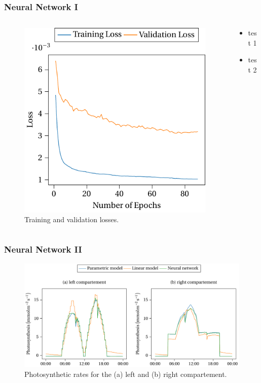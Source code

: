 \begin{frame}
    \frametitle{Neural Network I}

    \begin{columns}
        \begin{column}{0.6\textwidth}
            \begin{figure}
                \centering
                \includegraphics[scale=0.5]{figures/nn2.pdf}
                \caption{Training and validation losses.}
            \end{figure}
        \end{column}
        \begin{column}{0.4\textwidth}
            \begin{itemize}
                \item test 1
                \item test 2
            \end{itemize}
        \end{column}
    \end{columns}
\end{frame}

\begin{frame}
    \frametitle{Neural Network II}
    \begin{figure}
        \centering
        \includegraphics[scale=0.5]{figures/nn3.pdf}
        \caption{Photosynthetic rates for the (a) left and (b) right compartement.}
    \end{figure}
\end{frame}